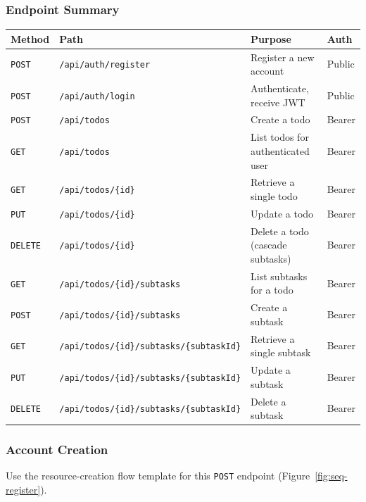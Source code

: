 \subsubsection{Endpoint Summary}
\begin{tabularx}{\textwidth}{@{} l l X l @{}}
  \toprule
  \textbf{Method} & \textbf{Path} & \textbf{Purpose} & \textbf{Auth} \\
  \midrule
  \texttt{POST}   & \texttt{/api/auth/register}                      & Register a new account          & Public \\
  \texttt{POST}   & \texttt{/api/auth/login}                         & Authenticate, receive JWT       & Public \\
  \texttt{POST}   & \texttt{/api/todos}                              & Create a todo                   & Bearer \\
  \texttt{GET}    & \texttt{/api/todos}                              & List todos for authenticated user & Bearer \\
  \texttt{GET}    & \texttt{/api/todos/\{id\}}                       & Retrieve a single todo          & Bearer \\
  \texttt{PUT}    & \texttt{/api/todos/\{id\}}                       & Update a todo                   & Bearer \\
  \texttt{DELETE} & \texttt{/api/todos/\{id\}}                       & Delete a todo (cascade subtasks) & Bearer \\
  \texttt{GET}    & \texttt{/api/todos/\{id\}/subtasks}              & List subtasks for a todo        & Bearer \\
  \texttt{POST}   & \texttt{/api/todos/\{id\}/subtasks}              & Create a subtask                & Bearer \\
  \texttt{GET}    & \texttt{/api/todos/\{id\}/subtasks/\{subtaskId\}} & Retrieve a single subtask       & Bearer \\
  \texttt{PUT}    & \texttt{/api/todos/\{id\}/subtasks/\{subtaskId\}} & Update a subtask                & Bearer \\
  \texttt{DELETE} & \texttt{/api/todos/\{id\}/subtasks/\{subtaskId\}} & Delete a subtask                & Bearer \\
  \bottomrule
\end{tabularx}

\subsubsection{Account Creation}
Use the resource-creation flow template for this \texttt{POST} endpoint (Figure~\ref{fig:seq-register}).

